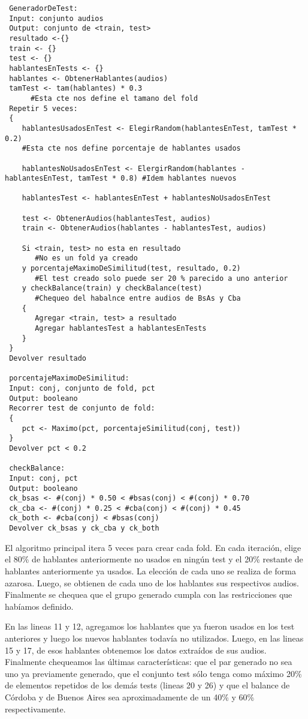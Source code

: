 \begin{lstlisting}
 GeneradorDeTest:
 Input: conjunto audios
 Output: conjunto de <train, test>
 resultado <-{}
 train <- {}
 test <- {}
 hablantesEnTests <- {}
 hablantes <- ObtenerHablantes(audios)
 tamTest <- tam(hablantes) * 0.3 
      #Esta cte nos define el tamano del fold
 Repetir 5 veces:
 {
    hablantesUsadosEnTest <- ElegirRandom(hablantesEnTest, tamTest * 0.2) 
    #Esta cte nos define porcentaje de hablantes usados
    
    hablantesNoUsadosEnTest <- ElergirRandom(hablantes - hablantesEnTest, tamTest * 0.8) #Idem hablantes nuevos
    
    hablantesTest <- hablantesEnTest + hablantesNoUsadosEnTest

    test <- ObtenerAudios(hablantesTest, audios)
    train <- ObtenerAudios(hablantes - hablantesTest, audios)

    Si <train, test> no esta en resultado 
       #No es un fold ya creado
    y porcentajeMaximoDeSimilitud(test, resultado, 0.2) 
       #El test creado solo puede ser 20 % parecido a uno anterior
    y checkBalance(train) y checkBalance(test) 
       #Chequeo del habalnce entre audios de BsAs y Cba
    {
       Agregar <train, test> a resultado
       Agregar hablantesTest a hablantesEnTests
    }
 }
 Devolver resultado
    
 porcentajeMaximoDeSimilitud:
 Input: conj, conjunto de fold, pct
 Output: booleano
 Recorrer test de conjunto de fold:
 {
    pct <- Maximo(pct, porcentajeSimilitud(conj, test))
 }
 Devolver pct < 0.2	

 checkBalance:
 Input: conj, pct
 Output: booleano
 ck_bsas <- #(conj) * 0.50 < #bsas(conj) < #(conj) * 0.70
 ck_cba <- #(conj) * 0.25 < #cba(conj) < #(conj) * 0.45
 ck_both <- #cba(conj) < #bsas(conj)
 Devolver ck_bsas y ck_cba y ck_both
\end{lstlisting}


El algoritmo principal itera 5 veces para crear cada fold. En cada iteración, elige el 80\% de hablantes anteriormente no usados en ningún test y el 20\% restante de hablantes anteriormente ya usados. La elección de cada uno se realiza de forma azarosa. Luego, se obtienen de cada uno de los hablantes sus respectivos audios. Finalmente se chequea que el grupo generado cumpla con las restricciones que habíamos definido.  

En las lineas 11 y 12, agregamos los hablantes que ya fueron usados en los test anteriores y luego los nuevos hablantes todavía no utilizados. Luego, en las lineas 15 y 17, de esos hablantes obtenemos los datos extraídos de sus audios. Finalmente chequeamos las últimas características: que el par generado no sea uno ya previamente generado, que el conjunto test sólo tenga como máximo 20\% de elementos repetidos de los demás tests (lineas 20 y 26) y que el balance de Córdoba y de Buenos Aires sea aproximadamente de un 40\% y 60\% respectivamente.

